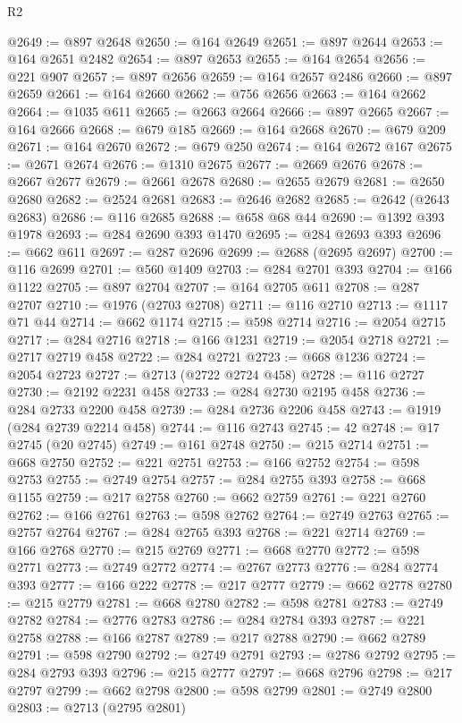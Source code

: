 \begin{lexlean}{R2}
\begin{coremodule}
@2649 := @897 @2648
@2650 := @164 @2649
@2651 := @897 @2644
@2653 := @164 @2651 @2482
@2654 := @897 @2653
@2655 := @164 @2654
@2656 := @221 @907
@2657 := @897 @2656
@2659 := @164 @2657 @2486
@2660 := @897 @2659
@2661 := @164 @2660
@2662 := @756 @2656
@2663 := @164 @2662
@2664 := @1035 @611
@2665 := @2663 @2664
@2666 := @897 @2665
@2667 := @164 @2666
@2668 := @679 @185
@2669 := @164 @2668
@2670 := @679 @209
@2671 := @164 @2670
@2672 := @679 @250
@2674 := @164 @2672 @167
@2675 := @2671 @2674
@2676 := @1310 @2675
@2677 := @2669 @2676
@2678 := @2667 @2677
@2679 := @2661 @2678
@2680 := @2655 @2679
@2681 := @2650 @2680
@2682 := @2524 @2681
@2683 := @2646 @2682
@2685 := @2642 (@2643 @2683)
@2686 := @116 @2685
@2688 := @658 @68 @44
@2690 := @1392 @393 @1978
@2693 := @284 @2690 @393 @1470
@2695 := @284 @2693 @393
@2696 := @662 @611
@2697 := @287 @2696
@2699 := @2688 (@2695 @2697)
@2700 := @116 @2699
@2701 := @560 @1409
@2703 := @284 @2701 @393
@2704 := @166 @1122
@2705 := @897 @2704
@2707 := @164 @2705 @611
@2708 := @287 @2707
@2710 := @1976 (@2703 @2708)
@2711 := @116 @2710
@2713 := @1117 @71 @44
@2714 := @662 @1174
@2715 := @598 @2714
@2716 := @2054 @2715
@2717 := @284 @2716
@2718 := @166 @1231
@2719 := @2054 @2718
@2721 := @2717 @2719 @458
@2722 := @284 @2721
@2723 := @668 @1236
@2724 := @2054 @2723
@2727 := @2713 (@2722 @2724 @458)
@2728 := @116 @2727
@2730 := @2192 @2231 @458
@2733 := @284 @2730 @2195 @458
@2736 := @284 @2733 @2200 @458
@2739 := @284 @2736 @2206 @458
@2743 := @1919 (@284 @2739 @2214 @458)
@2744 := @116 @2743
@2745 := 42
@2748 := @17 @2745 (@20 @2745)
@2749 := @161 @2748
@2750 := @215 @2714
@2751 := @668 @2750
@2752 := @221 @2751
@2753 := @166 @2752
@2754 := @598 @2753
@2755 := @2749 @2754
@2757 := @284 @2755 @393
@2758 := @668 @1155
@2759 := @217 @2758
@2760 := @662 @2759
@2761 := @221 @2760
@2762 := @166 @2761
@2763 := @598 @2762
@2764 := @2749 @2763
@2765 := @2757 @2764
@2767 := @284 @2765 @393
@2768 := @221 @2714
@2769 := @166 @2768
@2770 := @215 @2769
@2771 := @668 @2770
@2772 := @598 @2771
@2773 := @2749 @2772
@2774 := @2767 @2773
@2776 := @284 @2774 @393
@2777 := @166 @222
@2778 := @217 @2777
@2779 := @662 @2778
@2780 := @215 @2779
@2781 := @668 @2780
@2782 := @598 @2781
@2783 := @2749 @2782
@2784 := @2776 @2783
@2786 := @284 @2784 @393
@2787 := @221 @2758
@2788 := @166 @2787
@2789 := @217 @2788
@2790 := @662 @2789
@2791 := @598 @2790
@2792 := @2749 @2791
@2793 := @2786 @2792
@2795 := @284 @2793 @393
@2796 := @215 @2777
@2797 := @668 @2796
@2798 := @217 @2797
@2799 := @662 @2798
@2800 := @598 @2799
@2801 := @2749 @2800
@2803 := @2713 (@2795 @2801)

\end{coremodule}
\end{lexlean}
